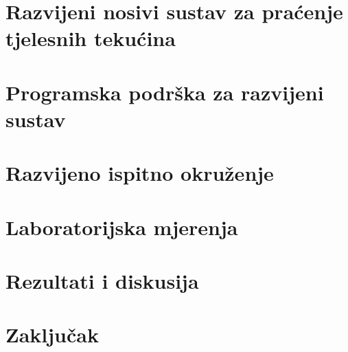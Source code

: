\documentclass[diplomskirad, numeric, utf8, times]{fer}
\begin{document}
\chapter{Razvijeni nosivi sustav za praćenje tjelesnih tekućina}



\chapter{Programska podrška za razvijeni sustav}
\label{chap:programska_podrska}



\chapter{Razvijeno ispitno okruženje}



\chapter{Laboratorijska mjerenja}



\chapter{Rezultati i diskusija}



\chapter{Zaključak}
\label{pog:zakljucak}





\nocite{*}

\end{document}
